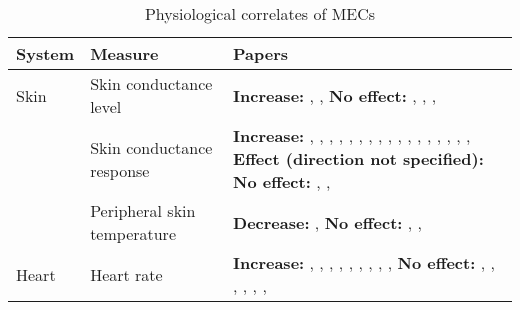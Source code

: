 \begin{table}[t!]
\centering
\scriptsize
\def\arraystretch{1.2}

\begin{threeparttable}
\caption{Physiological correlates of MECs}
\label{tab:rev-3}

\begin{tabular*}{\textwidth}{
    >{\raggedright}p{}
    >{\raggedright}p{}
    >{\raggedright\arraybackslash}p{}}

\hline

\textbf{System} & \textbf{Measure} & \textbf{Papers} \\ 

\hline
Skin & Skin conductance level & 
    \textbf{Increase:} \textcite{benedek2011}, \textcite{grewe2009a}, \textcite{mori2017} 
    \newline 
    \textbf{No effect:} \textcite{baltes2011}, \textcite{carr2016}, \textcite{jaimovich2013}, \textcite{schafer2011} \\ 

\cline{2-3}   
& Skin conductance response & 
    \textbf{Increase:} \textcite{bannister2018}, \textcite{benedek2011}, \textcite{craig2005}, \textcite{egermann2011}, \textcite{grewe2007}, \textcite{grewe2009a}, \textcite{grewe2011}, \textcite{guhn2007}, \textcite{klepzig2020}, \textcite{masherrero2014}, \textcite{mori2014b}, \textcite{mori2015}, \textcite{mori2017}, \textcite{polo2017}, \textcite{rickard2004}, \textcite{sachs2016}, \textcite{salimpoor2009}, \textcite{salimpoor2011} 
    \newline 
    \textbf{Effect (direction not specified):} \textcite{grewe2007} 
    \newline 
    \textbf{No effect:} \textcite{blood2001}, \textcite{carr2016}, \textcite{jaimovich2013} \\

\cline{2-3}
& Peripheral skin temperature & 
    \textbf{Decrease:} \textcite{salimpoor2009}, \textcite{salimpoor2011} 
    \newline 
    \textbf{No effect:} \textcite{blood2001}, \textcite{craig2005}, \textcite{rickard2004} \\

\hline
Heart & Heart rate & 
    \textbf{Increase:} \textcite{benedek2011}, \textcite{blood2001}, \textcite{grewe2009a}, \textcite{guhn2007}, \textcite{masherrero2014}, \textcite{polo2017}, \textcite{sachs2016}, \textcite{salimpoor2009}, \textcite{salimpoor2011}, \textcite{sumpf2015} 
    \newline 
    \textbf{No effect:} \textcite{baltes2011}, \textcite{carr2016}, \textcite{grewe2011}, \textcite{jaimovich2013}, \textcite{mori2017}, \textcite{rickard2004}, \textcite{schafer2011} \\


\end{tabular*}
\end{threeparttable}
\end{table}
